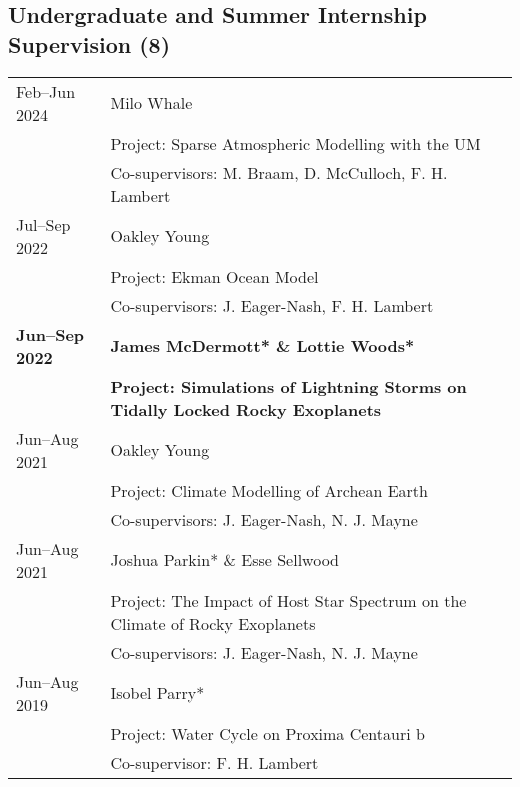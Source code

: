 \documentclass[a4paper, 11pt]{article}
\newcommand{\highlightbold}[1]{\textbf{\textcolor{exeter_bright_green}{#1}}}
\begin{document}
\subsection*{Undergraduate and Summer Internship Supervision (8)}
\begin{tabularx}{\linewidth}{@{}l X@{}}
Feb--Jun 2024 & Milo Whale \\
              & Project: Sparse Atmospheric Modelling with the UM \\
              & Co-supervisors: M. Braam, D. McCulloch, F. H. Lambert \\
Jul--Sep 2022 & Oakley Young \\
              & Project: Ekman Ocean Model \\
              & Co-supervisors: J. Eager-Nash, F. H. Lambert \\
\highlightbold{Jun--Sep 2022} & \highlightbold{James McDermott* \& Lottie Woods*} \\
                          & \highlightbold{Project: Simulations of Lightning Storms on Tidally Locked Rocky Exoplanets} \\
Jun--Aug 2021 & Oakley Young \\
              & Project: Climate Modelling of Archean Earth \\
              & Co-supervisors: J. Eager-Nash, N. J. Mayne \\
Jun--Aug 2021 & Joshua Parkin* \& Esse Sellwood \\
              & Project: The Impact of Host Star Spectrum on the Climate of Rocky Exoplanets \\
              & Co-supervisors: J. Eager-Nash, N. J. Mayne \\
Jun--Aug 2019 & Isobel Parry* \\
              & Project: Water Cycle on Proxima Centauri b \\
              & Co-supervisor: F. H. Lambert \\
\end{tabularx}

\end{document}
